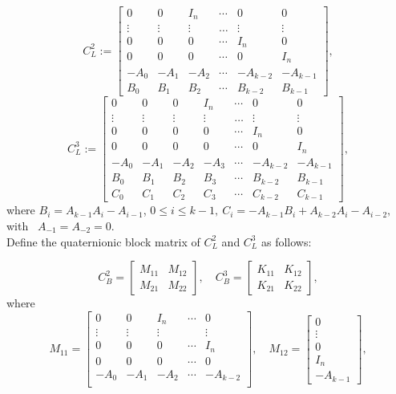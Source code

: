 \documentclass [12pt]{article}
\begin{document}
\[
C_L^2 :=
\begin{bmatrix}
0 & 0 & I_n & \cdots & 0 & 0 \\
\vdots & \vdots & \vdots & \dots & \vdots &\vdots\\
0 & 0 & 0 & \cdots & I_n & 0\\
0 & 0 & 0 & \cdots & 0& I_{n} \\
-A_0 & -A_1 & -A_2 & \cdots & -A_{k-2} & -A_{k-1}\\
B_0 & B_1 & B_2 & \cdots & B_{k-2} & B_{k-1}
\end{bmatrix},
\]
\[
C_L^3 :=
\begin{bmatrix}
0 & 0 &0& I_n & \cdots & 0 & 0 \\
\vdots & \vdots&\vdots & \vdots & \dots & \vdots &\vdots\\
0 & 0 & 0 &0& \cdots &  I_{n} & 0\\
0 & 0 & 0 & 0&\cdots & 0& I_{n} \\
-A_0 & -A_1 & -A_2 &-A_{3}& \cdots & -A_{k-2} & -A_{k-1}\\
B_0 & B_1 & B_2 & B_{3}&\cdots & B_{k-2} & B_{k-1}\\
C_0 & C_1 & C_2 & C_{3}&\cdots & C_{k-2} & C_{k-1}
\end{bmatrix},
\]
where $B_i = A_{k-1}A_i - A_{i-1}$, $0 \leq i \leq k-1,~ C_{i}=-A_{k-1}B_{i}+A_{k-2}A_{i}-A_{i-2},~$with~ $A_{-1}=A_{-2} = 0$.\\
Define the quaternionic block  matrix of $C_L^{2}$ and $C_L^{3}$ as follows:

\[
C_B^{2} = \begin{bmatrix} M_{11} & M_{12} \\ M_{21} & M_{22} \end{bmatrix},
\quad
C_B^{3} = \begin{bmatrix} K_{11} & K_{12} \\ K_{21} & K_{22} \end{bmatrix},
\]
where
\[
M_{11} = 
\begin{bmatrix}
0 & 0 & I_n & \cdots & 0 \\
\vdots & \vdots  & \vdots &  &\vdots\\
0 & 0 & 0 & \cdots & I_n \\
0 & 0 & 0 & \cdots & 0 \\
-A_0 & -A_1 & -A_2 & \cdots & -A_{k-2} \\
\end{bmatrix}, \quad M_{12} = 
\begin{bmatrix}
0 \\
\vdots \\
0\\
I_n\\ -A_{k-1}
\end{bmatrix},
\]
\end{document}

